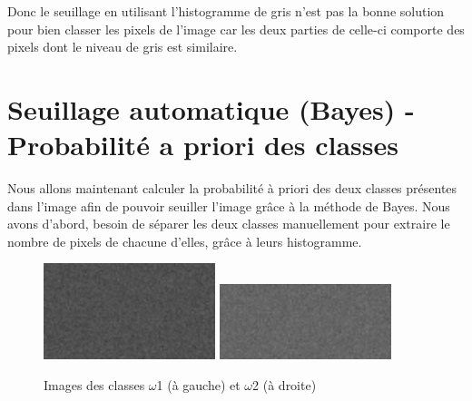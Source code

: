 \documentclass[a4paper,11pt]{article}
\begin{document}
  
  Donc le seuillage en utilisant l'histogramme de gris n'est pas la bonne solution pour 
  bien classer les pixels de l'image car les deux parties de celle-ci comporte des pixels
  dont le niveau de gris est similaire.
  
  \section{Seuillage automatique (Bayes) - Probabilité a priori des classes}
  Nous allons maintenant calculer la probabilité à priori des deux classes présentes dans l'image
  afin de pouvoir seuiller l'image grâce à la méthode de Bayes. Nous avons d'abord, besoin de séparer
  les deux classes manuellement pour extraire le nombre de pixels de chacune d'elles, grâce à leurs 
  histogramme.\\
  
  \begin{figure}[H]
    \center
    \includegraphics[width=5cm]{3classes_100_156_8bits_omega1.png}
    \includegraphics[width=5cm]{3classes_100_156_8bits_omega2.png}
    \caption{Images des classes $\omega$1 (à gauche) et $\omega$2 (à droite)}
  \end{figure}
  
\end{document}
